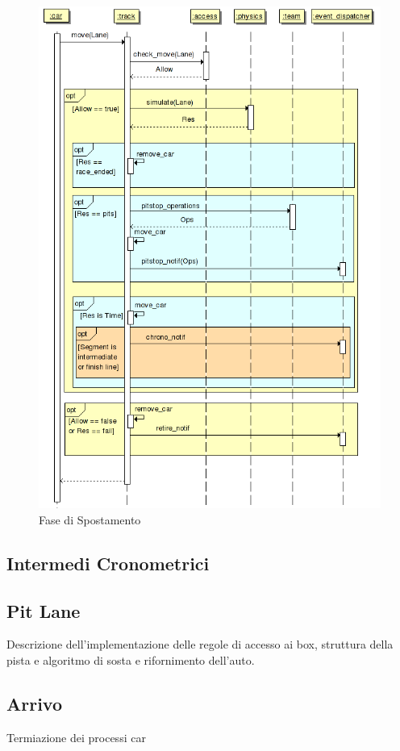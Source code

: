 \documentclass[11pt,a4paper]{report}
\begin{document}
\begin{figure}
\includegraphics[width=\textwidth]{diagrammi/Move}
\caption{Fase di Spostamento}
\label{fig:move}
\end{figure}
\subsection{Intermedi Cronometrici}
\subsection{Pit Lane}
Descrizione dell'implementazione delle regole di accesso ai box, struttura della pista e algoritmo di sosta e rifornimento dell'auto.
\subsection{Arrivo}
Termiazione dei processi car
\end{document}
